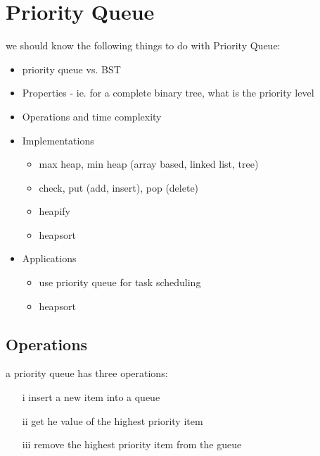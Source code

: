 \documentclass[12pt]{book}
\title{\coursetitle\linebreak\lecturename}
\author{\\Cain Susko\\ 
           \\ \\ \\
      Queen's University 
    \\School of Computing\\}
\begin{document}
\begin{titlepage}
        \maketitle
\end{titlepage}


\section*{Priority Queue}
we should know the following things to do with Priority Queue:
\begin{itemize}
        \item priority queue vs. BST
        \item Properties - ie. for a complete binary tree, what is the priority level
        \item Operations and time complexity
        \item Implementations
                \begin{itemize}
                        \item max heap, min heap (array based, linked list, tree)
                        \item check, put (add, insert), pop (delete)
                        \item heapify
                        \item heapsort
                \end{itemize}
        \item Applications
                \begin{itemize}
                        \item use priority queue for task scheduling 
                        \item heapsort
                \end{itemize}
\end{itemize}

\subsection*{Operations}
a priority queue has three operations:
\begin{itemize}
        \item[i] insert a new item into a queue
        \item[ii] get he value of the highest priority item
        \item[iii] remove the highest priority item from the gueue
\end{itemize}
\end{document}
